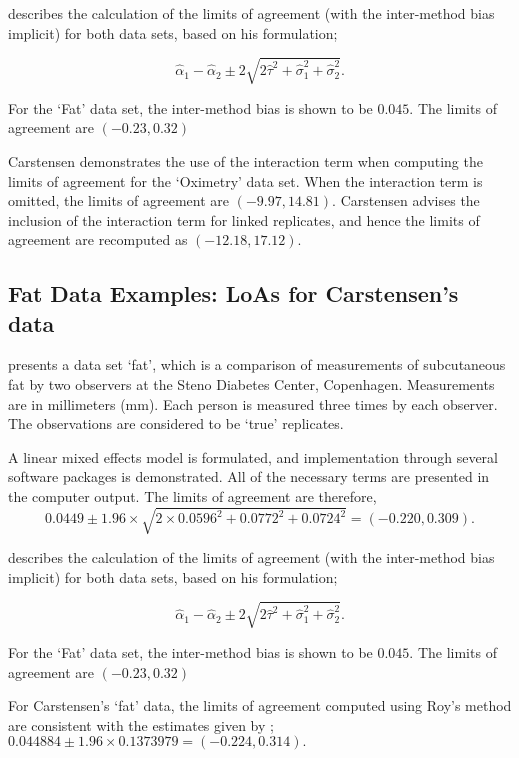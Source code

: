 \documentclass[12pt, a4paper]{report}
\theoremstyle{plain}
\theoremstyle{definition}
\theoremstyle{remark}
\begin{document}
	
	\citet{bxc2008} describes the calculation of the limits of agreement (with the inter-method bias implicit) for both data sets, based on his formulation;
	
	\[\hat{\alpha}_1 - \hat{\alpha}_2 \pm 2\sqrt{2\hat{\tau}^2 +\hat{\sigma}_1^2 +\hat{\sigma}_2^2 }.\]
	
	For the `Fat' data set, the inter-method bias is shown to be $0.045$. The limits of agreement are $(-0.23 , 0.32)$
	
	Carstensen demonstrates the use of the interaction term when computing the limits of agreement for the `Oximetry' data set. When the interaction term is omitted, the limits of agreement are $(-9.97, 14.81)$. Carstensen advises the inclusion of the interaction term for linked replicates, and hence the limits of agreement are recomputed as $(-12.18,17.12)$.
	
		
	\subsection{Fat Data Examples: LoAs for Carstensen's data}
	


		
	\citet{BXC2008} presents a data set `fat', which is a comparison of measurements of subcutaneous fat
	by two observers at the Steno Diabetes Center, Copenhagen. Measurements are in millimeters
	(mm). Each person is measured three times by each observer. The observations are considered to be `true' replicates.
	
	A linear mixed effects model is formulated, and implementation through several software packages is demonstrated.
	All of the necessary terms are presented in the computer output. The limits of agreement are therefore,
	\begin{equation}
	0.0449  \pm 1.96 \times  \sqrt{2 \times 0.0596^2 + 0.0772^2 + 0.0724^2} = (-0.220,  0.309).
	\end{equation}
		
	\citet{BXC2008} describes the calculation of the limits of agreement (with the inter-method bias implicit) for both data sets, based on his formulation;
	
	\[\hat{\alpha}_1 - \hat{\alpha}_2 \pm 2\sqrt{2\hat{\tau}^2 +\hat{\sigma}_1^2 +\hat{\sigma}_2^2 }.\]
	
	For the `Fat' data set, the inter-method bias is shown to be $0.045$. The limits of agreement are $(-0.23 , 0.32)$
	
	

	For Carstensen's `fat' data, the limits of agreement computed using Roy's
	method are consistent with the estimates given by \citet{BXC2008}; $0.044884  \pm 1.96 \times  0.1373979 = (-0.224,  0.314).$
	
\end{document}
